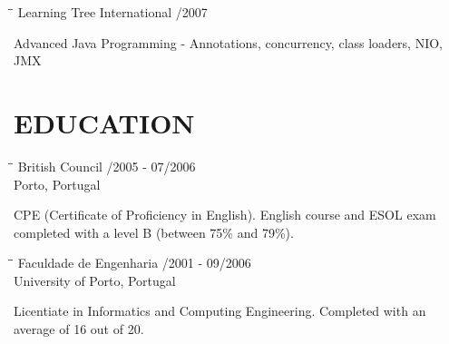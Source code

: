 \documentclass{res}
\begin{document}
\begin{resume}
\begin{tabbing}
\hspace{2.3in}\= \hspace{2.6in}\= \kill %
{\bf } \>Learning Tree International    
/2007\\ \>
\end{tabbing}\vspace{-20pt}
Advanced Java Programming - Annotations, concurrency, class loaders, NIO, JMX

\section{EDUCATION}

\begin{tabbing}
\hspace{2.3in}\= \hspace{2.6in}\= \kill %
{\bf } \>British Council
/2005 - 07/2006\\ \>Porto, Portugal
\end{tabbing}\vspace{-20pt}
CPE (Certificate of Proficiency in English).
English course and ESOL exam completed with a level B (between 75\% and 79\%).

\begin{tabbing}
\hspace{2.3in}\= \hspace{2.6in}\= \kill %
{\bf } \>Faculdade de Engenharia
/2001 - 09/2006\\ \>University of Porto, Portugal
\end{tabbing}\vspace{-20pt}
Licentiate in Informatics and Computing Engineering.
Completed with an average of 16 out of 20.

\end{resume}
\end{document}
